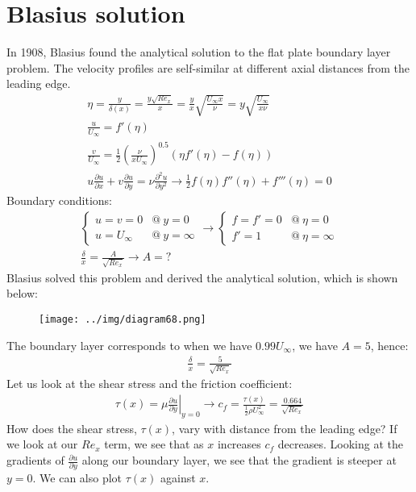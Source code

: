 \documentclass[class=report, crop=false, 12pt,a4paper]{standalone}
\begin{document}
\section{Blasius solution}
In 1908, Blasius found the analytical solution to the flat plate boundary layer problem. The velocity profiles are self-similar at different axial distances from the leading edge.
\begin{gather}
  \eta = \frac{y}{\delta (x)} = \frac{y\sqrt{Re_x}}{x} = \frac{y}{x} \sqrt{\frac{U_\infty x}{\nu}} = y\sqrt{\frac{U_\infty}{x\nu}}\\
  \frac{u}{U_\infty} = f'(\eta)\\
  \frac{v}{U_\infty} = \frac{1}{2} \left( \frac{\nu}{x U_\infty} \right)^{0.5} \left(\eta f'(\eta) - f (\eta)\right)\\
  u \frac{\partial u}{\partial x} + v\frac{\partial u}{\partial y} = \nu \frac{\partial^2 u}{\partial y^2} \rightarrow \frac{1}{2} f(\eta) f''(\eta)+f'''(\eta) = 0
\end{gather}
Boundary conditions:
\begin{gather}
  \begin{cases}
    u = v = 0 & @\  y = 0\\
    u = U_\infty & @\ y = \infty
  \end{cases}\rightarrow \begin{cases}
    f = f' = 0 & @ \ \eta = 0\\
    f' = 1 & @ \ \eta = \infty
  \end{cases}\\
  \frac{\delta}{x} = \frac{A}{\sqrt{Re_x}} \rightarrow A = ?
\end{gather}
Blasius solved this problem and derived the analytical solution, which is shown below:
\begin{figure}[H]
  \centering
  \texttt{[image: ../img/diagram68.png]}
\end{figure}
The boundary layer corresponds to when we have $0.99 U_\infty$, we have $A = 5$, hence:
\begin{align}
  \frac{\delta}{x} = \frac{5}{\sqrt{Re_x}}
\end{align}
Let us look at the shear stress and the friction coefficient:
\begin{align}
  \tau (x) = \mu \left. \frac{\partial u}{\partial y}\right|_{y=0} \rightarrow c_f = \frac{\tau (x)}{\frac{1}{2}\rho U^2_\infty} = \frac{0.664}{\sqrt{Re_x}}
\end{align}
How does the shear stress, $\tau (x)$, vary with distance from the leading edge? If we look at our $Re_x$ term, we see that as $x$ increases $c_f$ decreases. Looking at the gradients of $\frac{\partial u}{\partial y}$ along our boundary layer, we see that the gradient is steeper at $y = 0$. We can also plot $\tau (x)$ against $x$.
\end{document}
